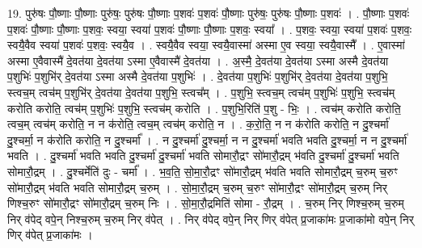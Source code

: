 \documentclass[17pt]{extarticle}
\begin{document}
19. पुरु॑षः पौ॒ष्णाः पौ॒ष्णाः पुरु॑षः॒ पुरु॑षः पौ॒ष्णाः प॒शवः॑ प॒शवः॑ पौ॒ष्णाः पुरु॑षः॒ पुरु॑षः पौ॒ष्णाः प॒शवः॑ । . पौ॒ष्णाः प॒शवः॑ प॒शवः॑ पौ॒ष्णाः पौ॒ष्णाः प॒शवः॒ स्वया॒ स्वया॑ प॒शवः॑ पौ॒ष्णाः पौ॒ष्णाः प॒शवः॒ स्वया᳚ । . प॒शवः॒ स्वया॒ स्वया॑ प॒शवः॑ प॒शवः॒ स्वयै॒वैव स्वया॑ प॒शवः॑ प॒शवः॒ स्वयै॒व । . स्वयै॒वैव स्वया॒ स्वयै॒वास्मा॑ अस्मा ए॒व स्वया॒ स्वयै॒वास्मै᳚ । . ए॒वास्मा॑ अस्मा ए॒वैवास्मै॑ दे॒वत॑या दे॒वत॑या ऽस्मा ए॒वैवास्मै॑ दे॒वत॑या । . अ॒स्मै॒ दे॒वत॑या दे॒वत॑या ऽस्मा अस्मै दे॒वत॑या प॒शुभिः॑ प॒शुभि॑र् दे॒वत॑या ऽस्मा अस्मै दे॒वत॑या प॒शुभिः॑ । . दे॒वत॑या प॒शुभिः॑ प॒शुभि॑र् दे॒वत॑या दे॒वत॑या प॒शुभि॒ स्त्वच॒म् त्वच॑म् प॒शुभि॑र् दे॒वत॑या दे॒वत॑या प॒शुभि॒ स्त्वच᳚म् । . प॒शुभि॒ स्त्वच॒म् त्वच॑म् प॒शुभिः॑ प॒शुभि॒ स्त्वच॑म् करोति करोति॒ त्वच॑म् प॒शुभिः॑ प॒शुभि॒ स्त्वच॑म् करोति । . प॒शुभि॒रिति॑ प॒शु - भिः॒ । . त्वच॑म् करोति करोति॒ त्वच॒म् त्वच॑म् करोति॒ न न क॑रोति॒ त्वच॒म् त्वच॑म् करोति॒ न । . क॒रो॒ति॒ न न क॑रोति करोति॒ न दु॒श्चर्मा॑ दु॒श्चर्मा॒ न क॑रोति करोति॒ न दु॒श्चर्मा᳚ । . न दु॒श्चर्मा॑ दु॒श्चर्मा॒ न न दु॒श्चर्मा॑ भवति भवति दु॒श्चर्मा॒ न न दु॒श्चर्मा॑ भवति । . दु॒श्चर्मा॑ भवति भवति दु॒श्चर्मा॑ दु॒श्चर्मा॑ भवति सोमारौ॒द्रꣳ सो॑मारौ॒द्रम् भ॑वति दु॒श्चर्मा॑ दु॒श्चर्मा॑ भवति सोमारौ॒द्रम् । . दु॒श्चर्मेति॑ दुः - चर्मा᳚ । . भ॒व॒ति॒ सो॒मा॒रौ॒द्रꣳ सो॑मारौ॒द्रम् भ॑वति भवति सोमारौ॒द्रम् च॒रुम् च॒रुꣳ सो॑मारौ॒द्रम् भ॑वति भवति सोमारौ॒द्रम् च॒रुम् । . सो॒मा॒रौ॒द्रम् च॒रुम् च॒रुꣳ सो॑मारौ॒द्रꣳ सो॑मारौ॒द्रम् च॒रुम् निर् णिश्च॒रुꣳ सो॑मारौ॒द्रꣳ सो॑मारौ॒द्रम् च॒रुम् निः । . सो॒मा॒रौ॒द्रमिति॑ सोमा - रौ॒द्रम् । . च॒रुम् निर् णिश्च॒रुम् च॒रुम् निर् व॑पेद् वपे॒न् निश्च॒रुम् च॒रुम् निर् व॑पेत् । . निर् व॑पेद् वपे॒न् निर् णिर् व॑पेत् प्र॒जाका॑मः प्र॒जाका॑मो वपे॒न् निर् णिर् व॑पेत् प्र॒जाका॑मः । \newline
\end{document}
